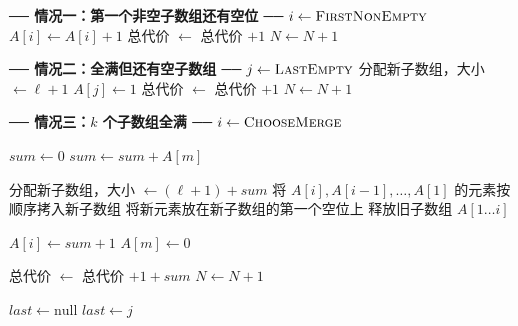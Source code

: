 \documentclass[12pt,a4paper]{article}
\begin{document}
\begin{algorithm}[ht]
\caption{插入一个新元素：\texttt{Grow()}}
\label{alg:grow}
\begin{algorithmic}[1]
\Statex \qquad\textbf{── 情况一：第一个非空子数组还有空位 ──}
\State $i \gets \Call{FirstNonEmpty}{}$ 
    \State $A[i] \gets A[i] + 1$
    \State 总代价 $\gets$ 总代价 $+ 1$
    \State $N \gets N + 1$
    \State \Return{}
\EndIf

\Statex \qquad\textbf{── 情况二：全满但还有空子数组 ──}
\State $j \gets \Call{LastEmpty}{}$ 
    \State 分配新子数组，大小 $\gets \ell+1$
    \State $A[j] \gets 1$ 
    \State 总代价 $\gets$ 总代价 $+ 1$
    \State $N \gets N + 1$
    \State \Return{}
\EndIf

\Statex \qquad\textbf{── 情况三：$k$ 个子数组全满 ──}
\State {}
\State $i \gets \Call{ChooseMerge}{}$ 

\State $sum \gets 0$
    \State $sum \gets sum + A[m]$ 
\EndFor

\State 分配新子数组，大小 $\gets (\ell+1) + sum$
\State 将 $A[i], A[i-1], \ldots, A[1]$ 的元素按顺序拷入新子数组
\State 将新元素放在新子数组的第一个空位上
\State 释放旧子数组 $A[1\ldots i]$

\State $A[i] \gets sum + 1$ 
    \State $A[m] \gets 0$ 
\EndFor

\State 总代价 $\gets$ 总代价 $+ 1 + sum$ 
\State $N \gets N + 1$
\end{algorithmic}
\end{algorithm}

\begin{algorithm}[ht]
\caption{辅助函数}
\label{alg:helpers}
\begin{algorithmic}[1]
            \State {}
        \EndIf
    \EndFor
    \State {} 
\EndFunction

\Statex

    \State $last \gets \text{null}$
            \State $last \gets j$
        \EndIf
    \EndFor
    \State {}
\EndFunction
\end{algorithmic}
\end{algorithm}
\end{document}

